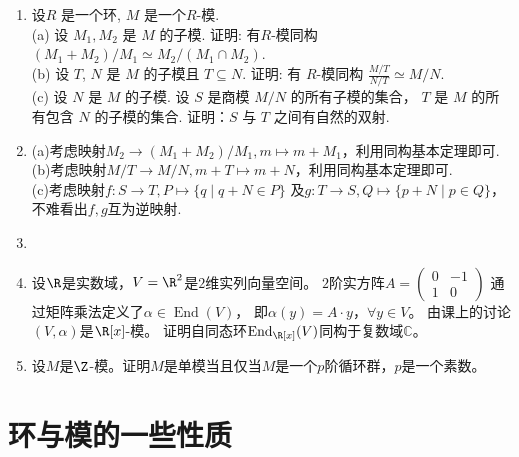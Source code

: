 \begin{enumerate}
  \item[1.7]
        设$R$ 是一个环, $M$ 是一个$R$-模.\\
(a) 设 $M_1, M_2$ 是 $M$ 的子模. 证明: 有$R$-模同构 
$(M_1 + M_2)/M_1\simeq M_2/(M_1 \cap M_2)$.\\
(b) 设 $T$, $N$ 是 $M$ 的子模且 $T \subseteq N$. 
证明: 有 $R$-模同构 $\frac{M/T}{N/T} \simeq M/N$.\\
(c) 设 $N$ 是 $M$ 的子模. 设 $S$ 是商模 $M/N$ 的所有子模的集合，
$T$ 是 $M$ 的所有包含 $N$ 的子模的集合. 证明：$S$ 与 $T$ 之间有自然的双射.
\item[\textbf{证明:}]    
    (a)考虑映射$M_2\rightarrow (M_1 + M_2)/M_1,m\mapsto m+M_1$，利用同构基本定理即可.\\
    (b)考虑映射$M/T\rightarrow M/N,m+T\mapsto m+N$，利用同构基本定理即可.\\
    (c)考虑映射$f:S\rightarrow T,P\mapsto \{q\mid q+N\in P\}$
    及$g:T\rightarrow S,Q\mapsto \{p+N\mid p\in Q\}$，不难看出$f,g$互为逆映射.

    \item[1.8]

    \item[1.9]设$\R$是实数域，$V=\R^2$是$2$维实列向量空间。
    $2$阶实方阵$A=\begin{pmatrix}0&-1\\1&0\end{pmatrix}$
    通过矩阵乘法定义了$\alpha\in\operatorname{End}(V)$，
    即$\alpha(y)=A \cdot y$，$\forall y\in V$。
    由课上的讨论$(V,\alpha)$是$\R[x]$-模。
    证明自同态环$\operatorname{End}_{\R[x]}(V)$同构于复数域$\mathbb{C}$。

    \item[1.10]设$M$是$\Z$-模。证明$M$是单模当且仅当$M$是一个$p$阶循环群，$p$是一个素数。
    \end{enumerate}
    

\section{环与模的一些性质}

